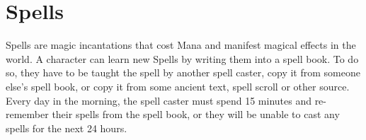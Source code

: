 \chapter*{Spells}
Spells are magic incantations that cost Mana and manifest magical effects in the world.
A character can learn new Spells by writing them into a spell book.
To do so, they have to be taught the spell by another spell caster, copy it from someone else's spell book, or copy it from some ancient text, spell scroll or other source.
Every day in the morning, the spell caster must spend 15 minutes and re-remember their spells from the spell book, or they will be unable to cast any spells for the next 24 hours.

	

	
	
	

	
	
	
	
	
	
	
	
	
	
	
	
	
	
	
	
	
	
	